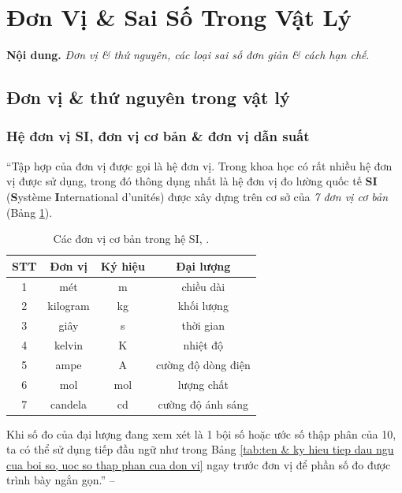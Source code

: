 \documentclass[oneside]{book}
\numberwithin{equation}{section}
\begin{document}

\section{Đơn Vị \& Sai Số Trong Vật Lý}
\textbf{Nội dung.} \textit{Đơn vị \& thứ nguyên, các loại sai số đơn giản \& cách hạn chế}.

\subsection{Đơn vị \& thứ nguyên trong vật lý}

\subsubsection{Hệ đơn vị SI, đơn vị cơ bản \& đơn vị dẫn suất}
``Tập hợp của đơn vị được gọi là hệ đơn vị. Trong khoa học có rất nhiều hệ đơn vị được sử dụng, trong đó thông dụng nhất là hệ đơn vị đo lường quốc tế \textbf{SI} (\textbf{S}yst\`eme \textbf{I}nternational d'unit\'es) được xây dựng trên cơ sở của \textit{7 đơn vị cơ bản} (Bảng \ref{tab:cac don vi co ban trong he SI}).
\begin{table}[H]
	\centering
	\begin{tabular}{|c|c|c|c|}
		\hline
		\textbf{STT} & \textbf{Đơn vị} & \textbf{Ký hiệu} & \textbf{Đại lượng} \\
		\hline
		1 & mét & m & chiều dài \\
		\hline
		2 & kilogram & kg & khối lượng \\
		\hline
		3 & giây & s & thời gian \\
		\hline
		4 & kelvin & K & nhiệt độ \\
		\hline
		5 & ampe & A & cường độ dòng điện \\
		\hline
		6 & mol & mol & lượng chất \\
		\hline
		7 & candela & cd & cường độ ánh sáng \\
		\hline
	\end{tabular}
	\caption{Các đơn vị cơ bản trong hệ SI, \cite[Bảng 3.1, p. 16]{SGK_Vat_Ly_10_Chan_Troi_Sang_Tao}.}
	\label{tab:cac don vi co ban trong he SI}
\end{table}
Khi số đo của đại lượng đang xem xét là 1 bội số hoặc ước số thập phân của 10, ta có thể sử dụng tiếp đầu ngữ như trong Bảng \ref{tab:ten & ky hieu tiep dau ngu cua boi so, uoc so thap phan cua don vi} ngay trước đơn vị để phần số đo được trình bày ngắn gọn.'' -- \cite[p. 15]{SGK_Vat_Ly_10_Chan_Troi_Sang_Tao}
\end{document}
